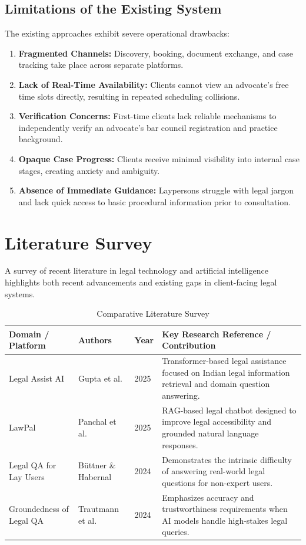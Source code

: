 \documentclass[12pt,a4paper]{report}
\begin{document}
\subsection{Limitations of the Existing System}
The existing approaches exhibit severe operational drawbacks:
\begin{enumerate}
    \item \textbf{Fragmented Channels:} Discovery, booking, document exchange, and case tracking take place across separate platforms.
    \item \textbf{Lack of Real-Time Availability:} Clients cannot view an advocate's free time slots directly, resulting in repeated scheduling collisions.
    \item \textbf{Verification Concerns:} First-time clients lack reliable mechanisms to independently verify an advocate's bar council registration and practice background.
    \item \textbf{Opaque Case Progress:} Clients receive minimal visibility into internal case stages, creating anxiety and ambiguity.
    \item \textbf{Absence of Immediate Guidance:} Laypersons struggle with legal jargon and lack quick access to basic procedural information prior to consultation.
\end{enumerate}

\section{Literature Survey}
A survey of recent literature in legal technology and artificial intelligence highlights both recent advancements and existing gaps in client-facing legal systems.

\begin{table}[h!]
    \centering
    \caption{Comparative Literature Survey}
    \label{tab:literature_survey}
    \small
    \begin{tabular}{p{3.5cm} p{3.2cm} p{1.2cm} p{6.5cm}}
        \toprule
        \textbf{Domain / Platform} & \textbf{Authors} & \textbf{Year} & \textbf{Key Research Reference / Contribution} \\
        \midrule
        Legal Assist AI & Gupta et al. & 2025 & Transformer-based legal assistance focused on Indian legal information retrieval and domain question answering. \\
        \addlinespace
        LawPal & Panchal et al. & 2025 & RAG-based legal chatbot designed to improve legal accessibility and grounded natural language responses. \\
        \addlinespace
        Legal QA for Lay Users & Büttner \& Habernal & 2024 & Demonstrates the intrinsic difficulty of answering real-world legal questions for non-expert users. \\
        \addlinespace
        Groundedness of Legal QA & Trautmann et al. & 2024 & Emphasizes accuracy and trustworthiness requirements when AI models handle high-stakes legal queries. \\
        \bottomrule
    \end{tabular}
\end{table}
\end{document}
